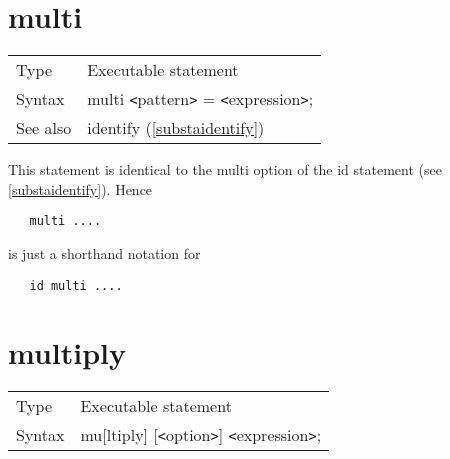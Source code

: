 
\section{multi}
\label{substamulti}

\noindent \begin{tabular}{ll}
Type & Executable statement\\
Syntax & multi {\tt<}pattern{\tt>} = {\tt<}expression{\tt>};
\\ See also & identify (\ref{substaidentify})
\end{tabular} \vspace{4mm}

\noindent This statement is identical to the multi option of 
the id statement (see \ref{substaidentify}). Hence
\begin{verbatim}
   multi ....
\end{verbatim}
is just a shorthand notation for
\begin{verbatim}
   id multi ....
\end{verbatim}
\vspace{10mm}

% 
%
%
%
 
\section{multiply}
\label{substamultiply}

\noindent \begin{tabular}{ll}
Type & Executable statement\\
Syntax & mu[ltiply] [{\tt<}option{\tt>}] {\tt<}expression{\tt>};
\end{tabular} \vspace{4mm}

